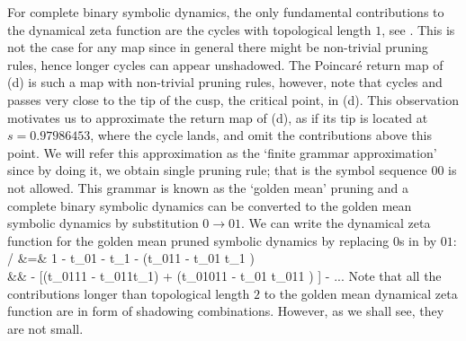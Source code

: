 For complete binary symbolic dynamics, the only fundamental contributions to the dynamical zeta function are the cycles with topological length $1$, see . This is not the case for any map since in general there might be non-trivial pruning rules, hence longer cycles can appear unshadowed. The Poincar\'e return map of  (d) is such a map with non-trivial pruning rules, however, note that cycles  and  passes very close to the tip of the cusp, the critical point, in  (d). This observation motivates us to approximate the return map of  (d), as if its tip is located at $s = 0.97986453$, where the cycle  lands, and omit the contributions above this point. We will refer this approximation as the `finite grammar approximation' since by doing it, we obtain single pruning rule; that is the symbol sequence $00$ is not allowed. This grammar is known as the `golden mean' pruning and a complete binary symbolic dynamics can be converted to the golden mean symbolic dynamics by substitution $0 \rightarrow 01$. We can write the dynamical zeta function for the golden mean pruned symbolic dynamics by replacing $0$s in  by $01$:
 / \zeta &=& 1 - t_{01} - t_1 - (t_{011} - t_{01} t_1 ) \label{e-GoldenMeanCycleExpansion}\\
		  && - [(t_{0111} - t_{011}t_1) + (t_{01011} - t_{01} t_{011} ) ] - ... \nonumber
\eea
Note that all the contributions longer than topological length $2$ to the golden mean dynamical zeta function are in form of shadowing combinations. However, as we shall see, they are not small.

